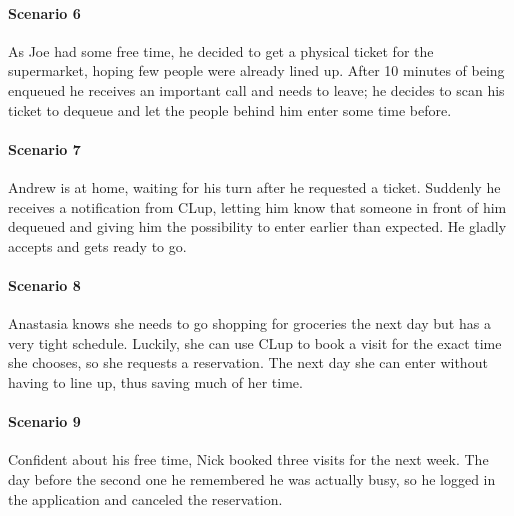 \paragraph{Scenario 6}
As Joe had some free time, he decided to get a physical ticket for the supermarket, hoping few people were already lined up. After 10 minutes of being enqueued he receives an important call and needs to leave; he decides to scan his ticket to dequeue and let the people behind him enter some time before.

\paragraph{Scenario 7}
Andrew is at home, waiting for his turn after he requested a ticket. Suddenly he receives a notification from CLup, letting him know that someone in front of him dequeued and giving him the possibility to enter earlier than expected. He gladly accepts and gets ready to go.

\paragraph{Scenario 8}
Anastasia knows she needs to go shopping for groceries the next day but has a very tight schedule. Luckily, she can use CLup to book a visit for the exact time she chooses, so she requests a reservation. The next day she can enter without having to line up, thus saving much of her time.

\paragraph{Scenario 9}
Confident about his free time, Nick booked three visits for the next week. The day before the second one he remembered he was actually busy, so he logged in the application and canceled the reservation.